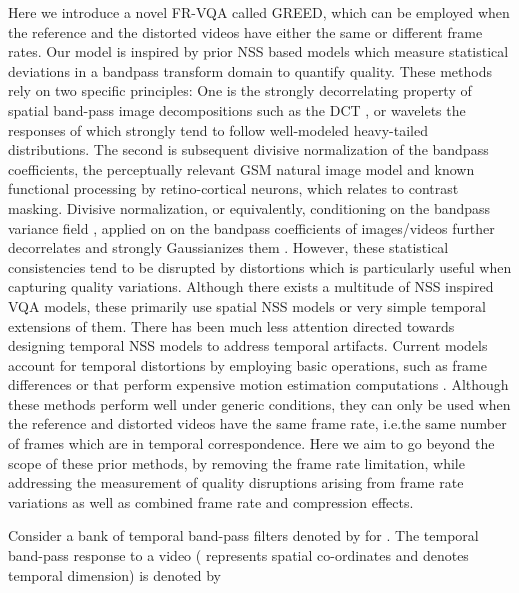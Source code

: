 \documentclass[journal]{IEEEtran}
\newcommand{\ie}{{i}.{e}.}
\begin{document}
Here we introduce a novel FR-VQA called GREED, which can be employed when the reference and the distorted videos have either the same or different frame rates. Our model is inspired by prior NSS based models which measure statistical deviations in a bandpass transform domain to quantify quality. These methods rely on two specific principles: One is the strongly decorrelating property of spatial band-pass image decompositions such as the DCT \cite{saad2014blind}, or wavelets \cite{sheikh2006image,soundararajan2012rred,soundararajan2012video} the responses of which strongly tend to follow well-modeled heavy-tailed distributions. The second is subsequent divisive normalization of the bandpass coefficients, the perceptually relevant GSM natural image model and known functional processing by retino-cortical neurons, which relates to contrast masking. Divisive normalization, or equivalently, conditioning on the bandpass variance field \cite{sheikh2006image}, applied on on the bandpass coefficients of images/videos further decorrelates and strongly Gaussianizes them \cite{ruderman1994statistics,mittal2012no}. However, these statistical consistencies tend to be disrupted by distortions which is particularly useful when capturing quality variations. Although there exists a multitude of NSS inspired VQA models, these primarily use spatial NSS models or very simple temporal extensions of them. There has been much less attention directed towards designing temporal NSS models to address temporal artifacts. Current models account for temporal distortions by employing basic operations, such as frame differences \cite{soundararajan2012video,saad2014blind,VMAF2016,bampis2018spatiotemporal} or that perform expensive motion estimation computations \cite{seshadrinathan2009motion,vu2011spatiotemporal,manasa2016optical}. Although these methods perform well under generic conditions, they can only  be used when the reference and distorted videos have the same frame rate, \ie the same number of frames which are in temporal correspondence. Here we aim to go beyond the scope of these prior methods, by removing the frame rate limitation, while addressing the measurement of quality disruptions arising from frame rate variations as well as combined frame rate and compression effects.

Consider a bank of  temporal band-pass filters denoted by  for . The temporal band-pass response to a video  ( represents spatial co-ordinates and  denotes temporal dimension) is denoted by
\end{document}
